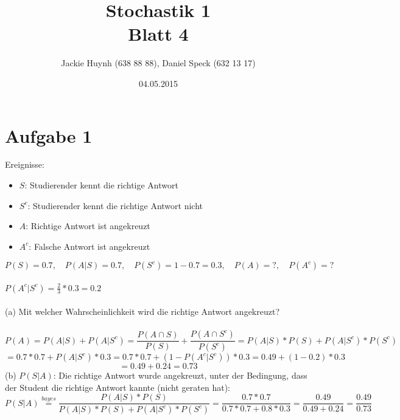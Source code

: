 \documentclass[10pt,a4paper]{article}
\title{\textbf{\huge Stochastik 1
\\\large Blatt 4}}
\author{Jackie Huynh (638 88 88), Daniel Speck (632 13 17)}
\date{04.05.2015}
\begin{document}
	\maketitle



	\section*{Aufgabe 1}
		
		Ereignisse:
		\begin{itemize}
			\item $S$:   \tabto{2.5em} Studierender kennt die richtige Antwort
			\item $S^c$: \tabto{2.5em} Studierender kennt die richtige Antwort nicht
			\item $A$:   \tabto{2.5em} Richtige Antwort ist angekreuzt
			\item $A^c$: \tabto{2.5em} Falsche Antwort ist angekreuzt
		\end{itemize}
		$P(S) = 0.7, \quad P(A|S) = 0.7, \quad P(S^c) = 1 - 0.7 = 0.3, \quad P(A) = ?, \quad P(A^c) = ?$
		\\
		\\
		$P(A^c|S^c) = \frac{2}{3} * 0.3 = 0.2$
		\\
		\\
		(a) Mit welcher Wahrscheinlichkeit wird die richtige Antwort angekreuzt?
		\\
		\\
		\begin{displaymath}
		P(A) = P(A|S) + P(A|S^c) = \frac{P(A \cap S)}{P(S)} + \frac{P(A \cap S^c)}{P(S^c)}
		= P(A|S) * P(S) + P(A|S^c) * P(S^c)
		\end{displaymath}
		\begin{displaymath}
		= 0.7*0.7 + P(A|S^c)*0.3 = 0.7*0.7 + (1 - P(A^c|S^c)) * 0.3 = 0.49 + (1 - 0.2) * 0.3
		\end{displaymath}
		\begin{displaymath}
		= 0.49 + 0.24 = 0.73
		\end{displaymath}
		(b) $P(S|A)$: \quad Die richtige Antwort wurde angekreuzt, unter der Bedingung, dass der Student die richtige Antwort kannte (nicht geraten hat):
		\begin{displaymath}
		P(S|A) \stackrel{bayes}{=} \frac{P(A|S)*P(S)}{P(A|S)*P(S) + P(A|S^c) * P(S^c)}
		= \frac{0.7 * 0.7}{0.7 * 0.7 + 0.8 * 0.3} = \frac{0.49}{0.49+0.24} = \frac{0.49}{0.73}
		\end{displaymath}
\end{document}
